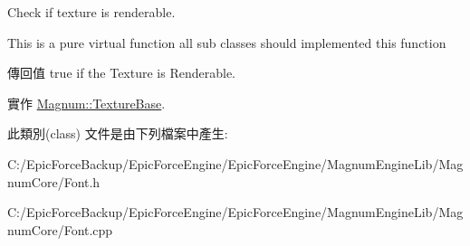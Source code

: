 Check if texture is renderable. 

This is a pure virtual function all sub classes should implemented this function \begin{DoxyReturn}{傳回值}
true if the Texture is Renderable. 
\end{DoxyReturn}


實作 \hyperlink{class_magnum_1_1_texture_base_a7e4d11ffd40d1a83e8838b5fc60cc4c2}{Magnum\+::\+Texture\+Base}.



此類別(class) 文件是由下列檔案中產生\+:\begin{DoxyCompactItemize}
\item 
C\+:/\+Epic\+Force\+Backup/\+Epic\+Force\+Engine/\+Epic\+Force\+Engine/\+Magnum\+Engine\+Lib/\+Magnum\+Core/Font.\+h\item 
C\+:/\+Epic\+Force\+Backup/\+Epic\+Force\+Engine/\+Epic\+Force\+Engine/\+Magnum\+Engine\+Lib/\+Magnum\+Core/Font.\+cpp\end{DoxyCompactItemize}
